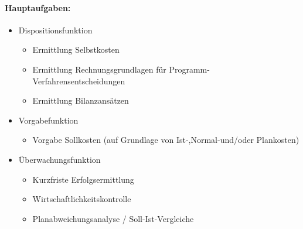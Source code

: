 \documentclass[../ZF_Wing.tex]{subfiles}
\begin{document}
\paragraph{Hauptaufgaben:\\}
\begin{itemize}
	\item Dispositionsfunktion
	\begin{itemize}
		\item Ermittlung Selbstkosten
		\item Ermittlung Rechnungsgrundlagen für Programm-Verfahrensentscheidungen
		\item Ermittlung Bilanzansätzen		
	\end{itemize}
	\item Vorgabefunktion
	\begin{itemize}
		\item Vorgabe Sollkosten (auf Grundlage von Ist-,Normal-und/oder Plankosten)
	\end{itemize}
	\item Überwachungsfunktion
	\begin{itemize}
		\item Kurzfriste Erfolgsermittlung
		\item Wirtschaftlichkeitskontrolle
		\item Planabweichungsanalyse / Soll-Ist-Vergleiche
	\end{itemize}
\end{itemize}
\end{document}
